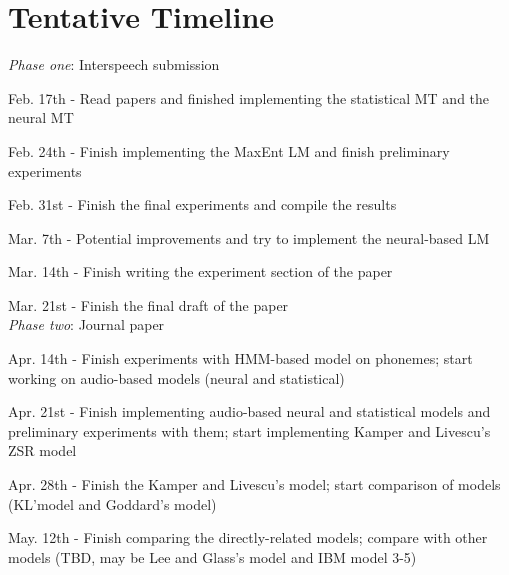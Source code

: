 \documentclass[a4paper]{article}
\begin{document}
\section{Tentative Timeline}
\textit{Phase one}: Interspeech submission

Feb. 17th - Read papers and finished implementing the statistical MT and the neural MT

Feb. 24th - Finish implementing the MaxEnt LM and finish preliminary experiments

Feb. 31st - Finish the final experiments and compile the results

Mar. 7th - Potential improvements and try to implement the neural-based LM

Mar. 14th - Finish writing the experiment section of the paper

Mar. 21st - Finish the final draft of the paper\\

\textit{Phase two}: Journal paper

Apr. 14th - Finish experiments with HMM-based model on phonemes; start working on audio-based models (neural and statistical)

Apr. 21st - Finish implementing audio-based neural and statistical models and preliminary experiments with them; start implementing Kamper and Livescu's ZSR model

Apr. 28th - Finish the Kamper and Livescu's model; start comparison of models (KL'model and Goddard's model)

May. 12th - Finish comparing the directly-related models; compare with other models (TBD, may be Lee and Glass's model and IBM model 3-5)


 
\end{document}

